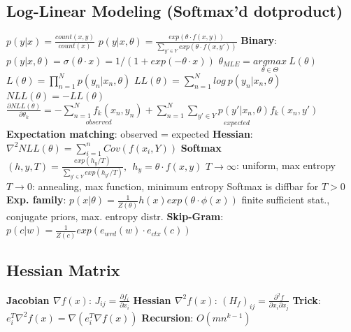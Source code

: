 \documentclass[a4paper, 11pt, landscape]{article}
\begin{document}
\begin{multicols*}{3}
\section{Log-Linear Modeling (Softmax'd dotproduct)}
$p(y|x)=\frac{count(x,y)}{count(x)}$\qquad 
$p(y|x,\theta)=\frac{exp(\theta \cdot f(x,y))}{\sum_{y'\in Y}{exp(\theta \cdot f(x,y'))}}$\newline
\textbf{Binary}: $p(y|x,\theta)=\sigma(\theta\cdot x)=1/(1+exp(-\theta\cdot x))$\newline
$\theta_{MLE}=\underset{{\theta \in \Theta}}{argmax}\ L(\theta)$\qquad
$L(\theta)=\prod_{n=1}^{N}p(y_n|x_n,\theta)$\newline
$LL(\theta)=\sum_{n=1}^{N}log \ p(y_n|x_n,\theta)$\qquad $NLL(\theta)=-LL(\theta)$\newline
$\frac{\partial NLL(\theta)}{\partial\theta_k}=\underset{{observed}}{-\sum_{n=1}^{N}{f_k(x_n,y_n)}}+\underset{{expected}}{\sum_{n=1}^{N}{\sum_{y'\in Y}{p(y'|x_n,\theta)f_k(x_n,y')}}}$\newline
\textbf{Expectation matching}: observed = expected\newline
\textbf{Hessian}: $\nabla^2NLL(\theta)=\sum_{i=1}^{n}{Cov(f(x_i,Y))}$\newline
\textbf{Softmax}$(h,y,T)=\frac{exp(h_y/T)}{\sum_{y'\in Y}{exp(h_{y'}/T)}}, \ \ h_y=\theta \cdot f(x,y)$\newline
$T\rightarrow \infty$: uniform, max entropy\newline
$T\rightarrow 0$: annealing, max function, minimum entropy\newline
Softmax is diffbar for $T>0$\newline
\textbf{Exp. family}: $p(x|\theta)=\frac{1}{Z(\theta)}h(x)exp(\theta\cdot \phi(x))$\newline
finite sufficient stat., conjugate priors, max. entropy distr.
\textbf{Skip-Gram}: $p(c|w)=\frac{1}{Z(c)}exp(e_{wrd}(w)\cdot e_{ctx}(c))$


\subsection{Hessian Matrix}
\textbf{Jacobian $\nabla f(x)$}: $J_{ij}=\frac{\partial f_i}{\partial x_i}$\quad
\textbf{Hessian $\nabla^2 f(x)$}: $(H_f)_{ij}=\frac{\partial^2 f}{\partial x_i\partial x_j}$\newline
\textbf{Trick}: $e_i^T\nabla^2f(x)=\nabla(e_i^T\nabla f(x))$\newline
\textbf{Recursion}: $O(mn^{k-1})$


\end{multicols*}
\end{document}
